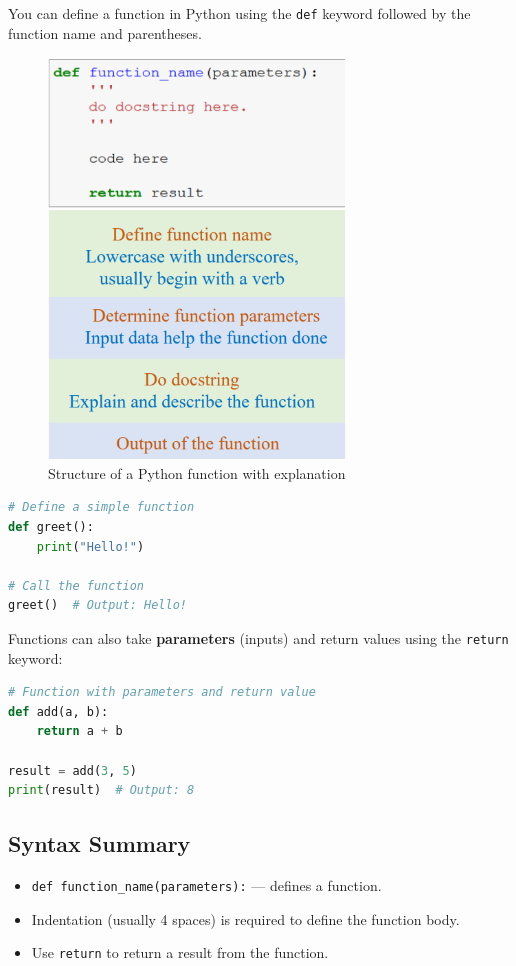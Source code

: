 \documentclass{article}
\begin{document}
You can define a function in Python using the \texttt{def} keyword followed by the function name and parentheses.
\begin{figure}[H]
    \centering
    \includegraphics[width=0.7\textwidth]{function_syntax.png}
    \caption{Structure of a Python function with explanation}
\end{figure}


\begin{lstlisting}[language=Python]
# Define a simple function
def greet():
    print("Hello!")

# Call the function
greet()  # Output: Hello!
\end{lstlisting}

Functions can also take \textbf{parameters} (inputs) and return values using the \texttt{return} keyword:

\begin{lstlisting}[language=Python]
# Function with parameters and return value
def add(a, b):
    return a + b

result = add(3, 5)
print(result)  # Output: 8
\end{lstlisting}

\subsection*{Syntax Summary}
\begin{itemize}
    \item \texttt{def function\_name(parameters):} — defines a function.
    \item Indentation (usually 4 spaces) is required to define the function body.
    \item Use \texttt{return} to return a result from the function.
\end{itemize}
\end{document}
